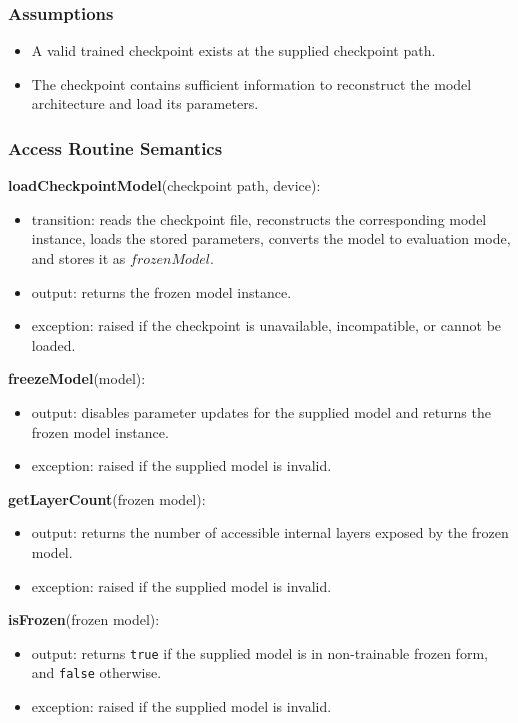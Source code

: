 \documentclass[12pt, titlepage]{article}
\begin{document}
\subsubsection{Assumptions}

\begin{itemize}
    \item A valid trained checkpoint exists at the supplied checkpoint path.
    \item The checkpoint contains sufficient information to reconstruct the model architecture and load its parameters.
\end{itemize}

\subsubsection{Access Routine Semantics}

\noindent \textbf{loadCheckpointModel}(checkpoint path, device):
\begin{itemize}
    \item transition: reads the checkpoint file, reconstructs the corresponding model instance, loads the stored parameters, converts the model to evaluation mode, and stores it as $frozenModel$.
    \item output: returns the frozen model instance.
    \item exception: raised if the checkpoint is unavailable, incompatible, or cannot be loaded.
\end{itemize}

\noindent \textbf{freezeModel}(model):
\begin{itemize}
    \item output: disables parameter updates for the supplied model and returns the frozen model instance.
    \item exception: raised if the supplied model is invalid.
\end{itemize}

\noindent \textbf{getLayerCount}(frozen model):
\begin{itemize}
    \item output: returns the number of accessible internal layers exposed by the frozen model.
    \item exception: raised if the supplied model is invalid.
\end{itemize}

\noindent \textbf{isFrozen}(frozen model):
\begin{itemize}
    \item output: returns \texttt{true} if the supplied model is in non-trainable frozen form, and \texttt{false} otherwise.
    \item exception: raised if the supplied model is invalid.
\end{itemize}
\end{document}
